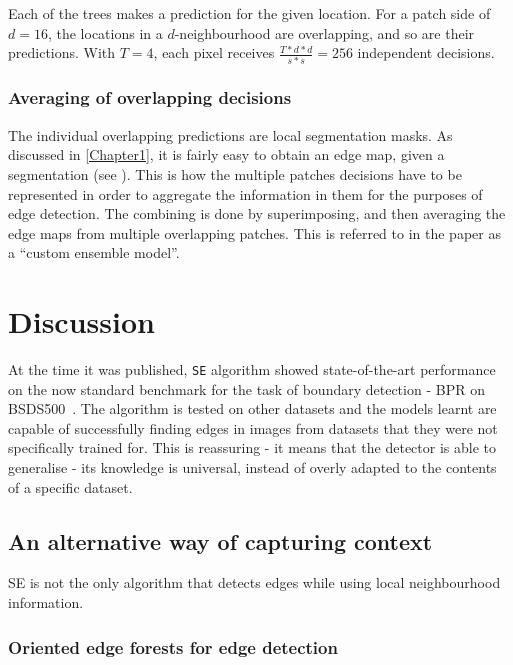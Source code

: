 Each of the trees makes a prediction for the given location. For a patch side of $d = 16$, the locations in a $d$-neighbourhood are overlapping, and so are their predictions. With $T=4$, each pixel receives $\frac{T*d*d}{s*s}=256$ independent decisions.


\subsubsection{Averaging of overlapping decisions}
The individual overlapping predictions %
are local segmentation masks. As discussed in \cref{Chapter1}, it is fairly easy to obtain an edge map, given a segmentation (see ). This is how the multiple patches decisions have to be represented in order to aggregate the information in them for the purposes of edge detection. The combining is done by superimposing, %
and then averaging the edge maps from multiple overlapping patches. %
This is referred to in the paper \cite{DollarICCV13edges} as a ``custom ensemble model''.

\section{Discussion}
At the time it was published, {\tt SE} algorithm showed state-of-the-art performance on the now standard benchmark for the task of boundary detection - BPR on BSDS500~\cite{Arbelaez11}. The algorithm is tested on other datasets and the models learnt are capable of successfully finding edges in images from datasets that they were not specifically trained for. This is reassuring - it means that the detector is able to generalise - its knowledge is universal, instead of overly adapted to %
the contents of a specific dataset.

\subsection{An alternative way of capturing context}
\label{sec:ch2-alternative-capturing-context}
SE is not the only algorithm that detects edges while using local neighbourhood information.

\subsubsection{Oriented edge forests for edge detection}
